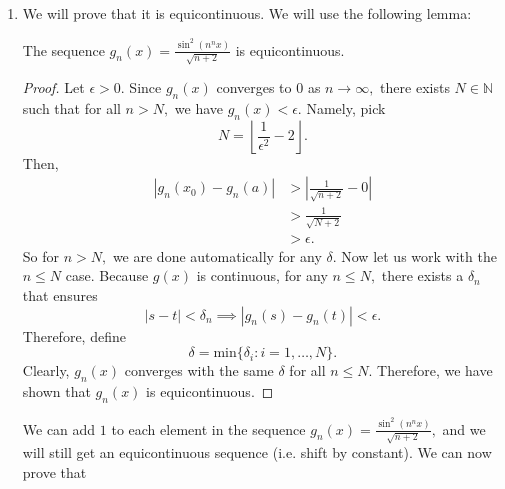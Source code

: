 \documentclass{article}
\numberwithin{equation}{section}
\begin{document}
\begin{enumerate}
    \newpage
    \item We will prove that it is equicontinuous. We will use the following lemma:
    \begin{lemma}
        The sequence $g_n(x)=\frac{\sin^2(n^n x)}{\sqrt{n+2}}$ is equicontinuous.
        \begin{proof}
            Let $\epsilon > 0.$ Since $g_n(x)$ converges to $0$ as $n\to \infty,$ there exists $N\in \mathbb{N}$ such that for all $n>N,$ we have $g_n(x) < \epsilon.$ Namely, pick 
            \begin{equation}
                N = \left\lfloor \frac{1}{\epsilon^2}-2 \right\rfloor. 
            \end{equation}
            Then,
            \begin{align}
                |g_n(x_0) - g_n(a)| &> \left|\frac{1}{\sqrt{n+2}} - 0\right| \\ 
                &> \frac{1}{\sqrt{N+2}} \\ 
                &> \epsilon.
            \end{align}
            So for $n>N,$ we are done automatically for any $\delta.$ Now let us work with the $n \le N$ case. Because $g(x)$ is continuous, for any $n \le N,$ there exists a $\delta_n$ that ensures 
            \begin{equation}
                |s-t| <\delta_n \implies |g_n(s)-g_n(t)| < \epsilon.
            \end{equation}
            Therefore, define 
            \begin{equation}
                \delta = \text{min}\{\delta_i:i=1,\dots, N\}.
            \end{equation}
            Clearly, $g_n(x)$ converges with the same $\delta$ for all $n \le N.$ Therefore, we have shown that $g_n(x)$ is equicontinuous.
        \end{proof}
    \end{lemma}
    We can add $1$ to each element in the sequence $g_n(x)=\frac{\sin^2(n^n x)}{\sqrt{n+2}},$ and we will still get an equicontinuous sequence (i.e. shift by constant). We can now prove that 

\end{enumerate}
\end{document}
